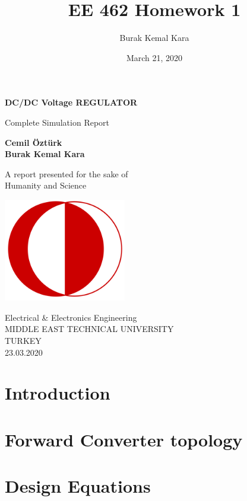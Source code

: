 \documentclass{article}
\title{EE 462 Homework 1}
\author{Burak Kemal Kara}
\date{March 21, 2020}
\begin{document}
\begin{titlepage}
    \begin{center}
        \vspace*{1cm}
            
        \Huge
        \textbf{DC/DC Voltage REGULATOR}
            
        \vspace{0.5cm}
        \LARGE
        Complete Simulation Report
            
        \vspace{1.5cm}
            
        \textbf{Cemil Öztürk}\\
        \textbf{Burak Kemal Kara}
            
        \vfill
            
        A report presented for the sake of\\
        Humanity and Science
            
        \vspace{0.8cm}
            
        \includegraphics[width=0.4\textwidth]{logo.png}
            
        \Large
        Electrical \& Electronics Engineering\\
        MIDDLE EAST TECHNICAL UNIVERSITY\\
        TURKEY\\
        23.03.2020
            
    \end{center}
\end{titlepage}
\tableofcontents
\newpage
\section{Introduction}
\section{Forward Converter topology}
\section{Design Equations}
\end{document}
